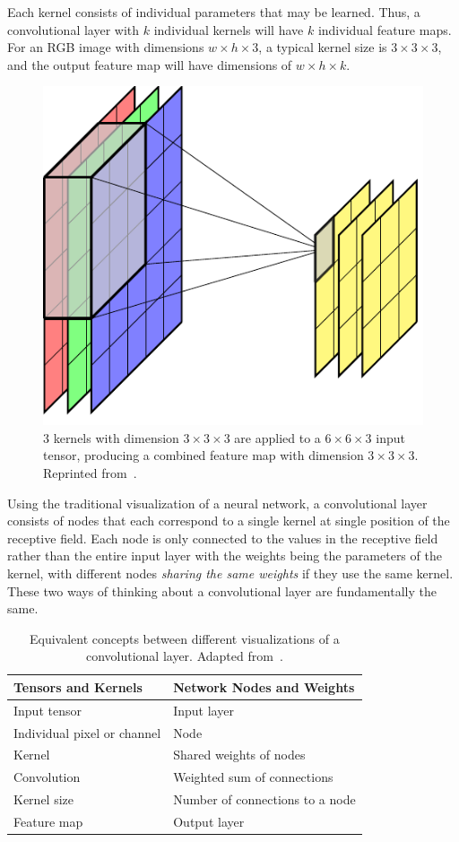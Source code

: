 \documentclass[12pt]{report}
\theoremstyle{definition}
\theoremstyle{remark}
\begin{document}
Each kernel consists of individual parameters that may be learned. Thus, a convolutional layer with $k$ individual kernels will have $k$ individual feature maps. For an RGB image with dimensions $w \times h \times 3$, a typical kernel size is $3 \times 3 \times 3$, and the output feature map will have dimensions of $w \times h \times k$.

\begin{figure}[h]
    \centering
    \includegraphics[width=0.5\linewidth]{figs/multiple_kernels.pdf}
    \caption{$3$ kernels with dimension $3 \times 3 \times 3$ are applied to a $6 \times 6 \times 3$ input tensor, producing a combined feature map with dimension $3 \times 3 \times 3$. Reprinted from~\cite{bishop_deep_2023}.}
    \label{fig:multiple-kernels}
\end{figure}

Using the traditional visualization of a neural network, a convolutional layer consists of nodes that each correspond to a single kernel at single position of the receptive field. Each node is only connected to the values in the receptive field rather than the entire input layer with the weights being the parameters of the kernel, with different nodes \textit{sharing the same weights} if they use the same kernel. These two ways of thinking about a convolutional layer are fundamentally the same.
\begin{table}[h]
    \centering
    \caption{Equivalent concepts between different visualizations of a convolutional layer. Adapted from~\cite{lee_convolutional_2021}.}
    \begin{tabular}{|l|l|}
        \hline
        \textbf{Tensors and Kernels} & \textbf{Network Nodes and Weights} \\
        \hline
        Input tensor & Input layer \\
        Individual pixel or channel & Node \\
        Kernel & Shared weights of nodes \\
        Convolution & Weighted sum of connections \\
        Kernel size & Number of connections to a node \\
        Feature map & Output layer \\
        \hline
    \end{tabular}
    \label{tab:cnn-architecture}
\end{table}
\end{document}

